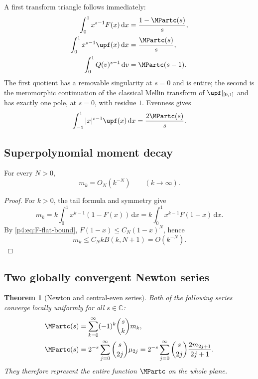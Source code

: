 \documentclass[11pt,oneside]{article}
\newtheorem{theorem}{Theorem}[section]
\theoremstyle{definition}
\theoremstyle{remark}
\newcommand{\F}{F}
\newcommand{\Q}{Q}
\newcommand{\C}{\mathbb C}
\newcommand{\dd}{\,\mathrm d}
\newcommand{\1}{\mathbf 1}
\begin{document}
A first transform triangle follows immediately:
\begin{align}
 \int_0^1x^{s-1}\F(x)\dd x&=\frac{1-\MPartc(s)}s,
 \label{p4:eq:Mellin-F}\\
 \int_0^1x^{s-1}\upf(x)\dd x&=\frac{\MPartc(s)}s,
 \label{p4:eq:Mellin-up-half}\\
 \int_0^1\Q(v)^{s-1}\dd v&=\MPartc(s-1).
 \label{p4:eq:Mellin-Q}
\end{align}
The first quotient has a removable singularity at \(s=0\) and is entire; the second
is the meromorphic continuation of the classical Mellin transform of \(\upf|_{[0,1]}\)
and has exactly one pole, at \(s=0\), with residue \(1\).  Evenness gives
\begin{equation}\label{p4:eq:absolute-Mellin-up}
 \int_{-1}^1|x|^{s-1}\upf(x)\dd x=\frac{2\MPartc(s)}s.
\end{equation}

\subsection{Superpolynomial moment decay}

\begin{lemma}\label{p4:lem:moment-decay}
For every \(N>0\),
\begin{equation}\label{p4:eq:moment-decay}
 m_k=O_N(k^{-N})\qquad(k\to\infty).
\end{equation}
\end{lemma}

\begin{proof}
For \(k>0\), the tail formula and symmetry give
\[
 m_k=k\int_0^1x^{k-1}(1-\F(x))\dd x
 =k\int_0^1x^{k-1}\F(1-x)\dd x.
\]
By \cref{p4:eq:F-flat-bound}, \(\F(1-x)\le C_N(1-x)^N\), hence
\[
 m_k\le C_N kB(k,N+1)=O(k^{-N}).
\]
\end{proof}

\subsection{Two globally convergent Newton series}

\begin{theorem}[Newton and central-even series]\label{p4:thm:newton}
Both of the following series converge locally uniformly for all \(s\in\C\):
\begin{align}
 \MPartc(s)&=\sum_{k=0}^{\infty}(-1)^k\binom{s}{k}m_k,
 \label{p4:eq:M-Newton}\\
 \MPartc(s)&=2^{-s}\sum_{j=0}^{\infty}\binom{s}{2j}\mu_{2j}
 =2^{-s}\sum_{j=0}^{\infty}\binom{s}{2j}\frac{2m_{2j+1}}{2j+1}.
 \label{p4:eq:M-central}
\end{align}
They therefore represent the entire function \(\MPartc\) on the whole plane.
\end{theorem}
\end{document}
